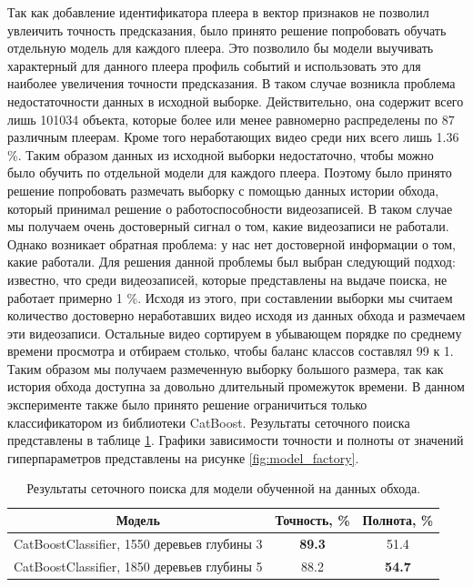 Так как добавление идентификатора плеера в вектор признаков не позволил увлеичить точность предсказания, было принято решение попробовать обучать отдельную модель для каждого плеера. Это позволило бы модели выучивать характерный для данного плеера профиль событий и использовать это для наиболее увеличения точности предсказания. В таком случае возникла проблема недостаточности данных в исходной выборке. Действительно, она содержит всего лишь 101034 объекта, которые более или менее равномерно распределены по 87 различным плеерам. Кроме того неработающих видео среди них всего лишь 1.36 \%. Таким образом данных из исходной выборки недостаточно, чтобы можно было обучить по отдельной модели для каждого плеера. Поэтому было принято решение попробовать размечать выборку с помощью данных истории обхода, который принимал решение о работоспособности видеозаписей. В таком случае мы получаем очень достоверный сигнал о том, какие видеозаписи не работали. Однако возникает обратная проблема: у нас нет достоверной информации о том, какие работали. Для решения данной проблемы был выбран следующий подход: известно, что среди видеозаписей, которые представлены на выдаче поиска, не работает примерно 1 \%. Исходя из этого, при составлении выборки мы считаем количество достоверно неработавших видео исходя из данных обхода и размечаем эти видеозаписи. Остальные видео сортируем в убывающем порядке по среднему времени просмотра и отбираем столько, чтобы баланс классов составлял 99 к 1. Таким образом мы получаем размеченную выборку большого размера, так как история обхода доступна за довольно длительный промежуток времени. В данном эксперименте также было принято решение ограничиться только классификатором из библиотеки CatBoost. Результаты сеточного поиска представлены в таблице \ref{tab:model_factory}. Графики зависимости точности и полноты от значений гиперпараметров представлены на рисунке \ref{fig:model_factory}.

\begin{table}[h]
    \centering
    \begin{tabular}{|c|c|c|}
        \hline
        Модель & Точность, \% & Полнота, \% \\
        \hline
        CatBoostClassifier, 1550 деревьев глубины 3 & \textbf{89.3} & 51.4 \\
        \hline
        CatBoostClassifier, 1850 деревьев глубины 5 & 88.2 & \textbf{54.7} \\
        \hline
    \end{tabular}
    \caption{Результаты сеточного поиска для модели обученной на данных обхода.}
    \label{tab:model_factory}
\end{table}

